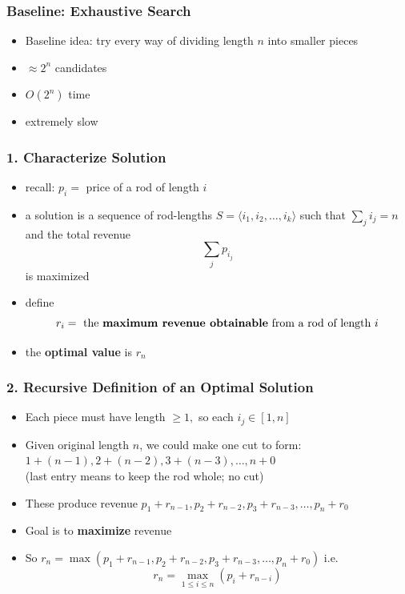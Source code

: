 \documentclass{beamer}
\begin{document}
\begin{frame} \frametitle{Baseline: Exhaustive Search}
  \begin{itemize}
  \item Baseline idea: try every way of dividing length $n$ into smaller pieces
  \item $\approx 2^n$ candidates
  \item $O(2^n)$ time
  \item extremely slow
  \end{itemize}
\end{frame}

\begin{frame} \frametitle{1. Characterize Solution}
  \begin{itemize}
  \item recall: $p_i = $ price of a rod of length $i$
  \item a solution is a sequence of rod-lengths $S = \langle i_1, i_2, \ldots, i_k \rangle$ such that $\sum_j i_j = n$ and the total revenue
    \[ \sum_j p_{i_j} \]
    is maximized
  \item define
    \[ r_i = \text{ the \textbf{maximum revenue obtainable} from a rod of length } i \]
  \item the \textbf{optimal value} is $r_n$
  \end{itemize}
\end{frame}
    
\begin{frame} \frametitle{2. Recursive Definition of an Optimal Solution}
  \begin{itemize}
  \item Each piece must have length $\geq 1,$ so each $i_j \in [1, n]$
  \item Given original length $n$, we could make one cut to form: \\
    $1+(n-1), 2+(n-2), 3+(n-3), \ldots, n+0$ \\
    (last entry means to keep the rod whole; no cut)
  \item These produce revenue
    $p_1+r_{n-1}, p_2 +r_{n-2}, p_3+r_{n-3}, \ldots, p_n + r_0$
  \item Goal is to \textbf{maximize} revenue
  \item So $r_n = \max(p_1+r_{n-1}, p_2 +r_{n-2}, p_3+r_{n-3}, \ldots, p_n + r_0)$ i.e.
    \[ r_n = \max_{1 \leq i \leq n} (p_i + r_{n-i}) \]
  \end{itemize}
  \end{frame}
\end{document}
